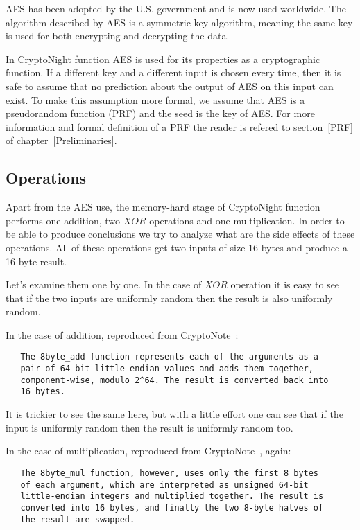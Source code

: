 AES has been adopted by the U.S. government and is now used worldwide. The algorithm described by AES is a symmetric-key algorithm, meaning the same key is used for both encrypting and decrypting the data.

In CryptoNight function AES is used for its properties as a cryptographic function. If a different key and a different input is chosen every time, then it is safe to assume that no prediction about the output of AES on this input can exist. To make this assumption more formal, we assume that AES is a pseudorandom function (PRF) and the seed is the key of AES. For more information and formal definition of a PRF the reader is refered to \hyperref[PRF]{section}~\ref{PRF} of \hyperref[Preliminaries]{chapter}~\ref{Preliminaries}.


\subsection{Operations}
Apart from the AES use, the memory-hard stage of CryptoNight function performs one addition, two $XOR$ operations and one multiplication. In order to be able to produce conclusions we try to analyze what are the side effects of these operations. All of these operations get two inputs of size 16 bytes and produce a 16 byte result.

Let's examine them one by one. In the case of $XOR$ operation it is easy to see that if the two inputs are uniformly random then the result is also uniformly random.

\noindent In the case of addition, reproduced from CryptoNote~\cite{cryptonight}:
\begin{verbatim}
   The 8byte_add function represents each of the arguments as a
   pair of 64-bit little-endian values and adds them together,
   component-wise, modulo 2^64. The result is converted back into
   16 bytes.
\end{verbatim}
It is trickier to see the same here, but with a little effort one can see that if the input is uniformly random then the result is uniformly random too.

\noindent In the case of multiplication, reproduced from CryptoNote~\cite{cryptonight}, again:
\begin{verbatim}
   The 8byte_mul function, however, uses only the first 8 bytes
   of each argument, which are interpreted as unsigned 64-bit
   little-endian integers and multiplied together. The result is
   converted into 16 bytes, and finally the two 8-byte halves of
   the result are swapped.
\end{verbatim}

